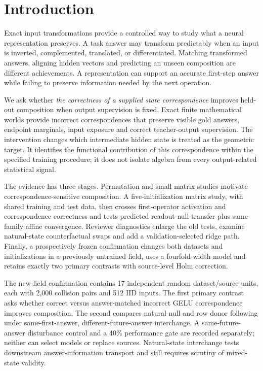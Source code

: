 \section{Introduction}
Exact input transformations provide a controlled way to study what a neural representation preserves. A task answer may transform predictably when an input is inverted, complemented, translated, or differentiated. Matching transformed answers, aligning hidden vectors and predicting an unseen composition are different achievements. A representation can support an accurate first-step answer while failing to preserve information needed by the next operation.

We ask whether \emph{the correctness of a supplied state correspondence} improves held-out composition when output supervision is fixed. Exact finite mathematical worlds provide incorrect correspondences that preserve visible gold answers, endpoint marginals, input exposure and correct teacher-output supervision. The intervention changes which intermediate hidden state is treated as the geometric target. It identifies the functional contribution of this correspondence within the specified training procedure; it does not isolate algebra from every output-related statistical signal.

The evidence has three stages. Permutation and small matrix studies motivate correspondence-sensitive composition. A five-initialization matrix study, with shared training and test data, then crosses first-operator activation and correspondence correctness and tests predicted readout-null transfer plus same-family affine convergence. Reviewer diagnostics enlarge the old tests, examine natural-state counterfactual swaps and add a validation-selected ridge path. Finally, a prospectively frozen confirmation changes both datasets and initializations in a previously untrained field, uses a fourfold-width model and retains exactly two primary contrasts with source-level Holm correction.

The new-field confirmation contains 17 independent random dataset/source units, each with 2,000 collision pairs and 512 IID inputs. The first primary contrast asks whether correct versus answer-matched incorrect GELU correspondence improves composition. The second compares natural null and row donor following under same-first-answer, different-future-answer interchange. A same-future-answer disturbance control and a 40\% performance gate are recorded separately; neither can select models or replace sources. Natural-state interchange tests downstream answer-information transport and still requires scrutiny of mixed-state validity.

